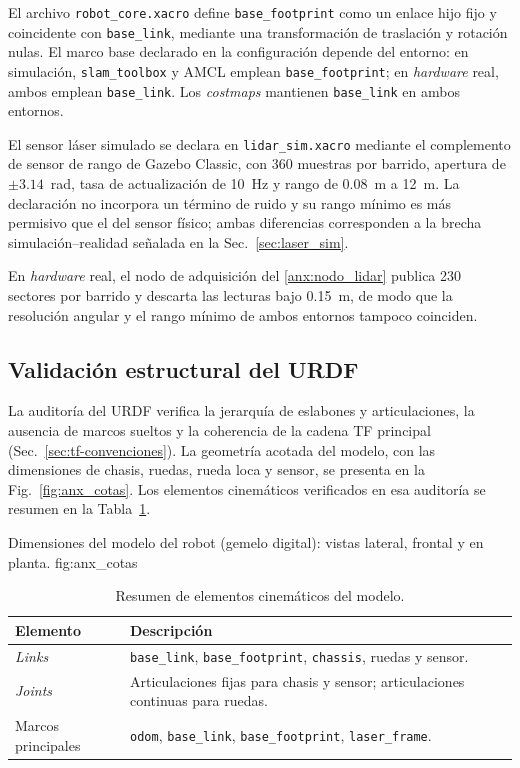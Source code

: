\begin{appendices}
El archivo \texttt{robot\_core.xacro} define \texttt{base\_footprint} como un enlace hijo fijo y coincidente con \texttt{base\_link}, mediante una transformación de traslación y rotación nulas. El marco base declarado en la configuración depende del entorno: en simulación, \texttt{slam\_toolbox} y AMCL emplean \texttt{base\_footprint}; en \textit{hardware} real, ambos emplean \texttt{base\_link}. Los \textit{costmaps} mantienen \texttt{base\_link} en ambos entornos.

El sensor láser simulado se declara en \texttt{lidar\_sim.xacro} mediante el
complemento de sensor de rango de Gazebo Classic, con 360 muestras por barrido,
apertura de $\pm3.14$~rad, tasa de actualización de 10~Hz y rango de 0.08~m a
12~m. La declaración no incorpora un término de ruido y su rango mínimo es
más permisivo que el del sensor físico; ambas diferencias corresponden a la
brecha simulación--realidad señalada en la Sec.~\ref{sec:laser_sim}.

En \textit{hardware} real, el nodo de adquisición del \ref{anx:nodo_lidar} publica 230
sectores por barrido y descarta las lecturas bajo 0.15~m, de modo que la
resolución angular y el rango mínimo de ambos entornos tampoco coinciden.
\subsection{Validación estructural del URDF}
\label{anx:validacion_urdf}

La auditoría del URDF verifica la jerarquía de eslabones y articulaciones, la ausencia de marcos sueltos y la coherencia de la cadena TF principal (Sec.~\ref{sec:tf-convenciones}). La geometría acotada del modelo, con las dimensiones de chasis, ruedas, rueda loca y sensor, se presenta en la Fig.~\ref{fig:anx_cotas}. Los elementos cinemáticos verificados en esa auditoría se resumen en la
Tabla~\ref{tab:anx_urdf_evidencia}.

{Dimensiones del modelo del robot (gemelo digital): vistas lateral, frontal y en planta.}
{fig:anx_cotas}

\begin{table}[H]
\centering
\caption{Resumen de elementos cinemáticos del modelo.}
\label{tab:anx_urdf_evidencia}
\small
\begin{tabular}{lp{11cm}}
\toprule
\textbf{Elemento} & \textbf{Descripción} \\
\midrule
\textit{Links} & \texttt{base\_link}, \texttt{base\_footprint}, \texttt{chassis}, ruedas y sensor. \\
\textit{Joints} & Articulaciones fijas para chasis y sensor; articulaciones continuas para ruedas. \\
Marcos principales & \texttt{odom}, \texttt{base\_link}, \texttt{base\_footprint}, \texttt{laser\_frame}. \\
\bottomrule
\end{tabular}
\end{table}


\end{appendices}
